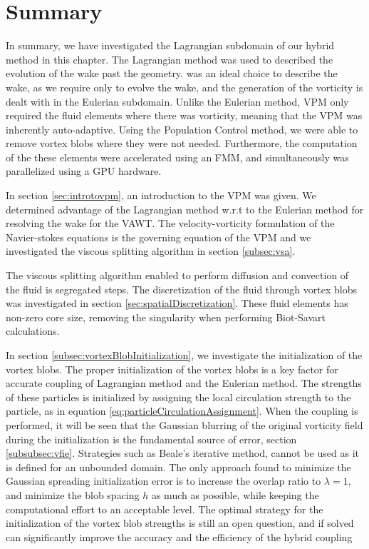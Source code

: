 \section{Summary}

In summary, we have investigated the Lagrangian subdomain of our hybrid method in this chapter. The Lagrangian method was used to described the evolution of the wake past the geometry.  was an ideal choice to describe the wake, as we require only to evolve the wake, and the generation of the vorticity is dealt with in the Eulerian subdomain. Unlike the Eulerian method, VPM only required the fluid elements where there was vorticity, meaning that the VPM was inherently auto-adaptive. Using the Population Control method, we were able to remove vortex blobs where they were not needed. Furthermore, the computation of the these elements were accelerated using an FMM, and simultaneously was parallelized using a GPU hardware. 

In section \ref{sec:introtovpm}, an introduction to the VPM was given. We determined advantage of the Lagrangian method w.r.t to the Eulerian method for resolving the wake for the VAWT. The velocity-vorticity formulation of the Navier-stokes equations is the governing equation of the VPM and we investigated the viscous splitting algorithm in section \ref{subsec:vsa}.

The viscous splitting algorithm enabled to perform diffusion and convection of the fluid is segregated steps. The discretization of the fluid through vortex blobs was investigated in section \ref{sec:spatialDiscretization}. These fluid elements has non-zero core size, removing the singularity when performing Biot-Savart calculations. 

In section \ref{subsec:vortexBlobInitialization}, we investigate the initialization of the vortex blobs. The proper initialization of the vortex blobs is a key factor for accurate coupling of Lagrangian method and the Eulerian method. The strengths of these particles is initialized by assigning the local circulation strength to the particle, as in equation \ref{eq:particleCirculationAssignment}. When the coupling is performed, it will be seen that the Gaussian blurring of the original vorticity field during the initialization is the fundamental source of error, section \ref{subsubsec:vfie}. Strategies such as Beale's iterative method, cannot be used as it is defined for an unbounded domain. The only approach found to minimize the Gaussian spreading initialization error is to increase the overlap ratio to $\lambda=1$, and minimize the blob spacing $h$ as much as possible, while keeping the computational effort to an acceptable level. The optimal strategy for the initialization of the vortex blob strengths is still an open question, and if solved can significantly improve the accuracy and the efficiency of the hybrid coupling

